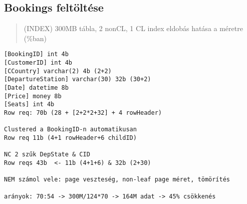 \documentclass[
]{article}
\begin{document}
\hypertarget{bookings-feltuxf6ltuxe9se}{%
\subsection{Bookings feltöltése}\label{bookings-feltuxf6ltuxe9se}}

\begin{quote}
(INDEX) 300MB tábla, 2 nonCL, 1 CL index eldobás hatása a méretre
(\%ban)
\end{quote}

\begin{verbatim}
[BookingID] int 4b
[CustomerID] int 4b
[CCountry] varchar(2) 4b (2+2)
[DepartureStation] varchar(30) 32b (30+2)
[Date] datetime 8b
[Price] money 8b
[Seats] int 4b 
Row req: 70b (28 + [2+2*2+32] + 4 rowHeader)

Clustered a BookingID-n automatikusan
Row req 11b (4+1 rowHeader+6 childID)

NC 2 szűk DepState & CID
Row reqs 43b  <- 11b (4+1+6) & 32b (2+30)

NEM számol vele: page veszteség, non-leaf page méret, tömörítés

arányok: 70:54 -> 300M/124*70 -> 164M adat -> 45% csökkenés
\end{verbatim}

\renewcommand*\contentsname{Tartalomjegyzék}
{
\hypersetup{linkcolor=}
\setcounter{tocdepth}{3}
\tableofcontents
}
\end{document}
